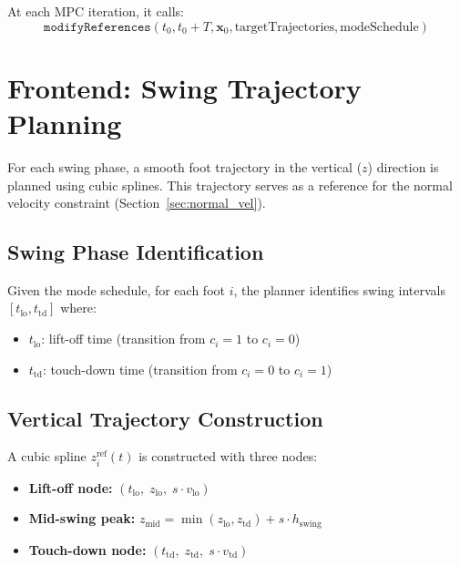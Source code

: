 \documentclass[11pt,a4paper]{article}
\begin{document}
At each MPC iteration, it calls:
\begin{equation*}
	\texttt{modifyReferences}(t_0, t_0 + T, \bm{x}_0, \text{targetTrajectories}, \text{modeSchedule})
\end{equation*}


\section{Frontend: Swing Trajectory Planning}
\label{sec:swing}

For each swing phase, a smooth foot trajectory in the vertical ($z$) direction is planned using cubic splines. This trajectory serves as a reference for the normal velocity constraint (Section~\ref{sec:normal_vel}).

\subsection{Swing Phase Identification}

Given the mode schedule, for each foot $i$, the planner identifies swing intervals $[t_{\text{lo}}, t_{\text{td}}]$ where:
\begin{itemize}
	\item $t_{\text{lo}}$: lift-off time (transition from $c_i=1$ to $c_i=0$)
	\item $t_{\text{td}}$: touch-down time (transition from $c_i=0$ to $c_i=1$)
\end{itemize}

\subsection{Vertical Trajectory Construction}

A cubic spline $z_i^{\text{ref}}(t)$ is constructed with three nodes:

\begin{itemize}
	\item \textbf{Lift-off node:} $(t_{\text{lo}},\; z_{\text{lo}},\; s \cdot v_{\text{lo}})$
	\item \textbf{Mid-swing peak:} $z_{\text{mid}} = \min(z_{\text{lo}}, z_{\text{td}}) + s \cdot h_{\text{swing}}$
	\item \textbf{Touch-down node:} $(t_{\text{td}},\; z_{\text{td}},\; s \cdot v_{\text{td}})$
\end{itemize}
\end{document}
